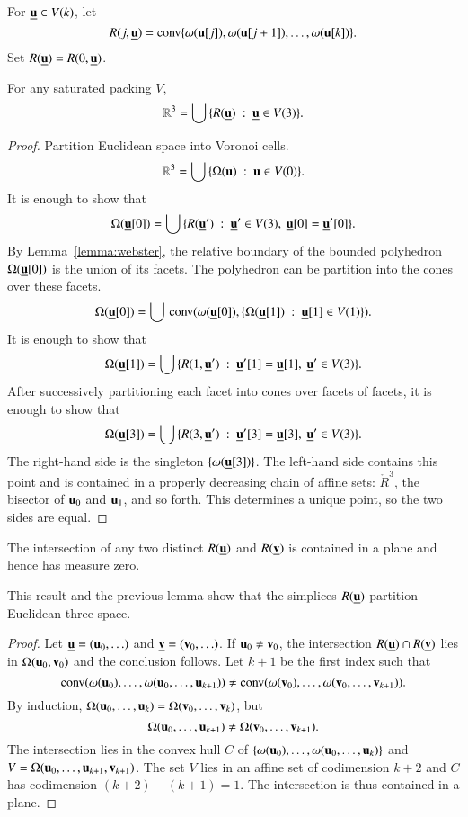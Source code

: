 For ${\underline{{\mathbf u}}}\in V(k)$, let 
$$R(j,{\underline{{\mathbf u}}}) = {\operatorname{conv}}\{\omega( {\mathbf u}[j]), \omega( {\mathbf u}[j+1]),\ldots,\omega( {\mathbf u}[k])\}.$$  Set $R({\underline{{\mathbf u}}})=R(0,{\underline{{\mathbf u}}})$.
%


\begin{lemma}
For any saturated packing $ V$, 
$$\mathbb{R}^3 = \bigcup\, \{ R({\underline{{\mathbf u}}}) \ :\  {\underline{{\mathbf u}}}\in  V(3)\}.$$
\end{lemma}

\begin{proof}
Partition Euclidean space into Voronoi cells. 
$$\mathbb{R}^3 = \bigcup\, \{\Omega( {\mathbf u})\ :\   {\mathbf u}\in  V(0)\}.$$
It is enough to show that
$$\Omega({\underline{{\mathbf u}}}[0]) = \bigcup\, \{ R({\underline{{\mathbf u}}}') \ :\  {\underline{{\mathbf u}}}'\in  V(3),~{\underline{{\mathbf u}}}[0]={\underline{{\mathbf u}}}'[0]\}.$$
By Lemma~\ref{lemma:webster}, the relative boundary of the bounded polyhedron $\Omega({\underline{{\mathbf u}}}[0])$ is the union of its facets.   The polyhedron can be partition into the cones over these facets.
$$\Omega({\underline{{\mathbf u}}}[0]) = \bigcup\, {\operatorname{conv}}(\omega({\underline{{\mathbf u}}}[0]),\{\Omega({\underline{{\mathbf u}}}[1])\ :\  {\underline{{\mathbf u}}}[1]\in  V(1)\}).$$
It is enough to show that
$$\Omega({\underline{{\mathbf u}}}[1]) = \bigcup\, \{ R(1,{\underline{{\mathbf u}}}') \ :\  {\underline{{\mathbf u}}}'[1]={\underline{{\mathbf u}}}[1],~{\underline{{\mathbf u}}}'\in  V(3)\}.$$
After successively partitioning each facet into cones over facets of facets, it is enough to show that
$$\Omega({\underline{{\mathbf u}}}[3]) = \bigcup\,\{R(3,{\underline{{\mathbf u}}}')\ :\ {\underline{{\mathbf u}}}'[3]={\underline{{\mathbf u}}}[3],~{\underline{{\mathbf u}}}'\in V(3)\}.$$
The right-hand side is the singleton $\{\omega({\underline{{\mathbf u}}}[3])\}$.  The left-hand side
contains this point and is contained in a properly decreasing chain of affine sets:
$\ring{R}^3$, the bisector of $ {\mathbf u}_0$ and $ {\mathbf u}_1$, and so forth.  This determines a unique point,
so the two sides are equal.
\end{proof}

\begin{lemma}  
The intersection of any two distinct $R({\underline{{\mathbf u}}})$ and $R({\underline{{\mathbf v}}})$ is contained in a plane 
and hence has measure zero.
\end{lemma}

This result and the previous lemma show that the simplices $R({\underline{{\mathbf u}}})$ partition Euclidean
three-space.

\begin{proof}  Let ${\underline{{\mathbf u}}} = ( {\mathbf u}_0,\ldots)$ and ${\underline{{\mathbf v}}} = ({\mathbf v}_0,\ldots)$.
If $ {\mathbf u}_0\ne{\mathbf v}_0$, the intersection $R({\underline{{\mathbf u}}})\cap R({\underline{{\mathbf v}}})$  lies in $\Omega( {\mathbf u}_0,{\mathbf v}_0)$
and the conclusion follows.  Let $k+1$ be the first index such that
$${\operatorname{conv}}(\omega( {\mathbf u}_0),\ldots,\omega( {\mathbf u}_0,\ldots, {\mathbf u}_{k+1}))\ne
{\operatorname{conv}}(\omega({\mathbf v}_0),\ldots,\omega({\mathbf v}_0,\ldots,{\mathbf v}_{k+1})).
$$
By induction, $\Omega( {\mathbf u}_0,\ldots, {\mathbf u}_k) = \Omega({\mathbf v}_0,\ldots,{\mathbf v}_k)$,
but
$$\Omega( {\mathbf u}_0,\ldots, {\mathbf u}_{k+1}) \ne \Omega({\mathbf v}_0,\ldots,{\mathbf v}_{k+1}).$$
The intersection lies in the convex hull $C$ of
$\{\omega( {\mathbf u}_0),\ldots,\omega( {\mathbf u}_0,\ldots, {\mathbf u}_k)\}$ and
$V=\Omega( {\mathbf u}_0,\ldots, {\mathbf u}_{k+1},{\mathbf v}_{k+1})$.  The set $V$ lies in an affine set of 
codimension $k+2$
and $C$ has codimension $(k+2) - (k+1) = 1$.  The intersection is thus contained in a plane.
\end{proof}

